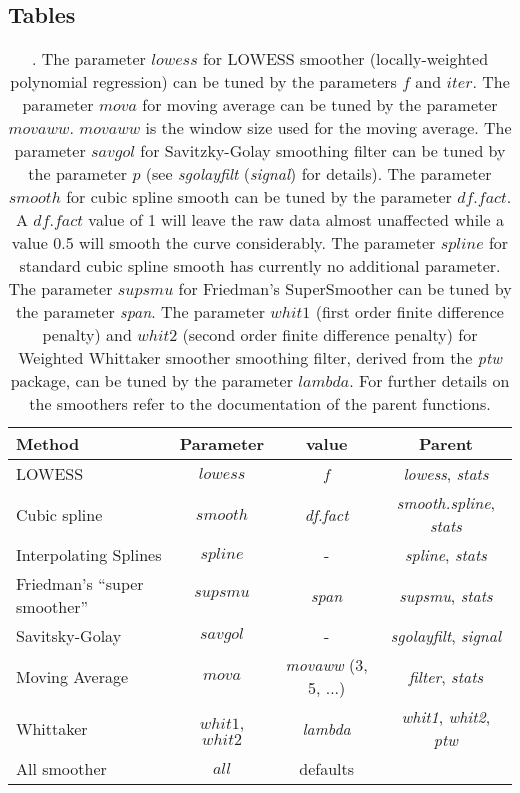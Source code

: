\documentclass[twocolumn]{bmcart}%
\begin{document}
\begin{backmatter}

\section*{Tables}
\begin{table*}[b]
\caption{\label{table:tab1} . The parameter $lowess$ for LOWESS smoother 
(locally-weighted polynomial regression) can be tuned by the parameters $f$ and 
$iter$. The parameter $mova$ for moving average can be tuned by the parameter 
$movaww$. $movaww$ is the window size used for the moving average. The parameter 
$savgol$ for Savitzky-Golay smoothing filter can be tuned by the parameter $p$ 
(see \textsl{sgolayfilt} (\emph{signal}) for details). The parameter $smooth$ 
for cubic spline smooth can be tuned by the parameter $df.fact$. A $df.fact$ 
value of 1 will leave the raw data almost unaffected while a value 0.5 will 
smooth the curve considerably. The parameter $spline$ for standard cubic spline 
smooth has currently no additional parameter. The parameter $supsmu$ for 
Friedman's SuperSmoother can be tuned by the parameter \textsl{span}. The 
parameter $whit1$ (first order finite difference penalty) and $whit2$ (second 
order finite difference penalty) for Weighted Whittaker smoother smoothing 
filter, derived from the \emph{ptw} package, can be tuned by the parameter 
$lambda$. For further details on the smoothers refer to the documentation of the 
parent functions.
}
\begin{tabular}{lccc}
  \hline
  Method & Parameter & value & Parent\\ \hline
  LOWESS & $lowess$ & \textit{f} & \textsl{lowess}, \emph{stats} \\
  Cubic spline & $smooth$ & \textit{df.fact} & \textsl{smooth.spline}, 
\emph{stats} \\
  Interpolating Splines & $spline$ & - & \textsl{spline}, \emph{stats} \\
  Friedman's ``super smoother'' & $supsmu$ & \textit{span} & \textsl{supsmu}, 
\emph{stats}\\
  Savitsky-Golay & $savgol$ & - & \textsl{sgolayfilt}, \emph{signal} \\
  Moving Average & $mova$ & \textit{movaww} (3, 5, ...) & \textsl{filter}, 
\emph{stats} \\
  Whittaker & $whit1$, $whit2$ & \textit{lambda} & \textsl{whit1}, 
\textsl{whit2},
\emph{ptw}  \\
  All smoother & $all$ & defaults &
  \\ \hline
\end{tabular}
\end{table*}


\end{backmatter}
\end{document}
